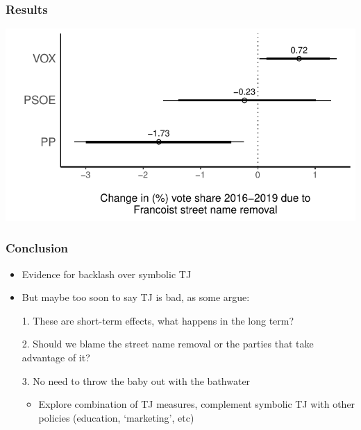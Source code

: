 \documentclass[aspectratio=43]{beamer}
\begin{document}
\begin{frame}
\frametitle{Results}
\centering

\includegraphics[width = \textwidth]{../main_models/output/DiD_estimates}

\end{frame}


\begin{frame}
\frametitle{Conclusion}
\centering

\begin{itemize}[<+->]
  \item Evidence for backlash over symbolic TJ
  \item But maybe too soon to say TJ is bad, as some argue:
  \item[1.] These are short-term effects, what happens in the long term?
  \item[2.] Should we blame the street name removal or the parties that take advantage of it?
  \item[3.] No need to throw the baby out with the bathwater
  \begin{itemize}
    \item Explore combination of TJ measures, complement symbolic TJ with other policies (education, `marketing', etc)
  \end{itemize}
\end{itemize}

\end{frame}
\end{document}
